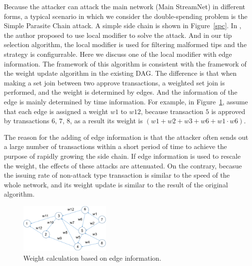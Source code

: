 Because the attacker can attack the main network (Main StreamNet) in different forms,
a typical scenario in which we consider the double-spending problem is the Simple Parasite Chain attack.
A simple side chain is shown in Figure~\ref{spc}. 
In \cite{iota_proof}, the author proposed to use local modifier to solve the attack. And in our tip selection algorithm, 
the local modifier is used for filtering malformed tips and the strategy is configurrable. 
Here we discuss one of the local modifier with edge information.
The framework of this algorithm is consistent with the framework of the weight update algorithm in the existing DAG.
The difference is that when making a set join between two approve transactions, a weighted set join is performed, and the weight is determined by edges. 
And the information of the edge is mainly determined by time information. 
For example, in Figure~\ref{edge_info}, assume that each edge is assigned a weight $w1$ to $w12$, 
because transaction $5$ is approved by transactions $6$, $7$, $8$, as a result its weight is $(w1+w2+w3+w6+w1 \cdot w6)$.

The reason for the adding of edge information is that the attacker often sends out a large number of transactions 
within a short period of time to achieve the purpose of rapidly growing the side chain. 
If edge information is used to rescale the weight, the effects of these attacks are attenuated. 
On the contrary, becasue the issuing rate of non-attack type transaction is similar to the speed of the whole network,
and its weight update is similar to the result of the original algorithm.

\begin{figure}[!ht]
\begin{center}
\includegraphics[width=0.40\textwidth]{figures/edge_info.pdf}
    \caption{
        Weight calculation based on edge information.
     }
\label{edge_info}
\end{center}
\end{figure}

